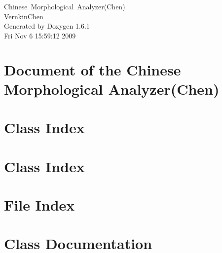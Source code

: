 \documentclass[a4paper]{book}
\begin{document}
\begin{titlepage}
\vspace*{7cm}
\begin{center}
{\Large Chinese~Morphological~Analyzer(Chen) \\[1ex]\large VernkinChen }\\
\vspace*{1cm}
{\large Generated by Doxygen 1.6.1}\\
\vspace*{0.5cm}
{\small Fri Nov 6 15:59:12 2009}\\
\end{center}
\end{titlepage}
\clearemptydoublepage
{}
\tableofcontents
\clearemptydoublepage
{}
\chapter{Document of the Chinese Morphological Analyzer(Chen)}
\label{index}
\chapter{Class Index}

\chapter{Class Index}

\chapter{File Index}

\chapter{Class Documentation}






































\end{document}
